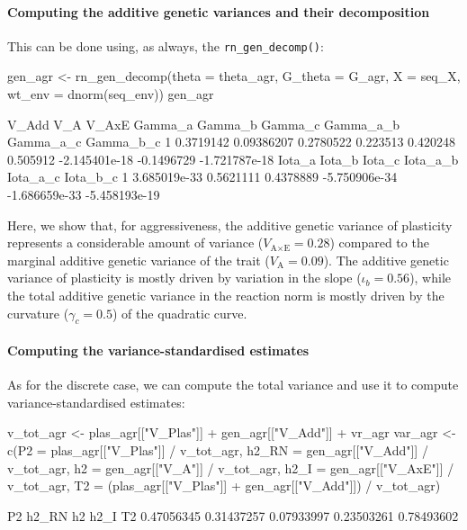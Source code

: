 \documentclass[a4paper,12pt,twoside]{article}
\begin{document}
\paragraph{Computing the additive genetic variances and their decomposition}
This can be done using, as always, the \texttt{rn\_gen\_decomp()}:
\begin{Rinput}
gen_agr <-
    rn_gen_decomp(theta     = theta_agr,
                  G_theta   = G_agr,
                  X         = seq_X,
                  wt_env    = dnorm(seq_env))
gen_agr
\end{Rinput}
\begin{Routput}
      V_Add        V_A     V_AxE  Gamma_a  Gamma_b  Gamma_c     Gamma_a_b  Gamma_a_c     Gamma_b_c
1 0.3719142 0.09386207 0.2780522 0.223513 0.420248 0.505912 -2.145401e-18 -0.1496729 -1.721787e-18
        Iota_a    Iota_b    Iota_c      Iota_a_b      Iota_a_c      Iota_b_c
1 3.685019e-33 0.5621111 0.4378889 -5.750906e-34 -1.686659e-33 -5.458193e-19
\end{Routput}
Here, we show that, for aggressiveness, the additive genetic variance of plasticity represents a considerable amount of variance ($V_{\text{A}\times\text{E}}=0.28$) compared to the marginal additive genetic variance of the trait ($V_{\text{A}}=0.09$).
The additive genetic variance of plasticity is mostly driven by variation in the slope ($\iota_{b} = 0.56$), while the total additive genetic variance in the reaction norm is mostly driven by the curvature ($\gamma_{c}=0.5$) of the quadratic curve.

\paragraph{Computing the variance-standardised estimates}
As for the discrete case, we can compute the total variance and use it to compute variance-standardised estimates:
\begin{Rinput}
v_tot_agr <- plas_agr[["V_Plas"]] + gen_agr[["V_Add"]] + vr_agr
var_agr <-
    c(P2     = plas_agr[["V_Plas"]] / v_tot_agr,
      h2_RN  = gen_agr[["V_Add"]] / v_tot_agr,
      h2     = gen_agr[["V_A"]] / v_tot_agr,
      h2_I   = gen_agr[["V_AxE"]] / v_tot_agr,
      T2     = (plas_agr[["V_Plas"]] + gen_agr[["V_Add"]]) / v_tot_agr)
\end{Rinput}
\begin{Routput}
        P2      h2_RN         h2       h2_I         T2 
0.47056345 0.31437257 0.07933997 0.23503261 0.78493602 
\end{Routput}
\end{document}
